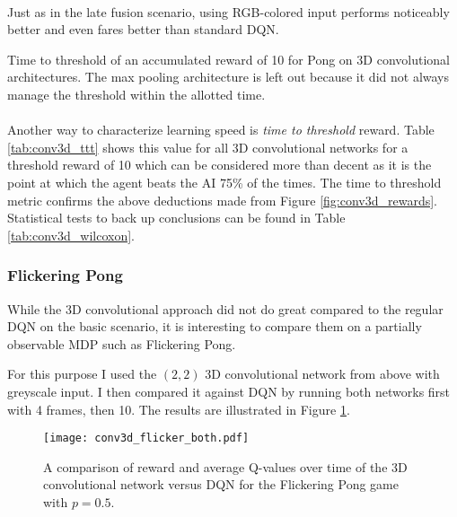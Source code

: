 \paragraph{}
Just as in the late fusion scenario,
using RGB-colored input performs noticeably better
and even fares better than standard DQN.

\begin{table}
  \center
  \renewcommand{\arraystretch}{1.3}
  
  \caption[3D Conv time to threshold]{
    Time to threshold
    of an accumulated reward of 10
    for Pong
    on 3D convolutional architectures.
    The max pooling architecture is left out
    because it did not always manage the threshold
    within the allotted time.
  }
  \label{tab:conv3d_ttt}
\end{table}

\paragraph{}
Another way to characterize learning speed is
\textit{time to threshold} reward.
Table \ref{tab:conv3d_ttt}
shows this value for all 3D convolutional networks
for a threshold reward of 10
which can be considered more than decent
as it is the point at which
the agent beats the AI
75\% of the times.
The time to threshold metric
confirms the above deductions made
from Figure \ref{fig:conv3d_rewards}.
Statistical tests to back up conclusions
can be found in Table \ref{tab:conv3d_wilcoxon}.

\subsubsection{Flickering Pong}
While the 3D convolutional approach
did not do great compared to the regular DQN
on the basic scenario,
it is interesting to compare them
on a partially observable MDP
such as Flickering Pong.

For this purpose I used the $(2,2)$ 3D convolutional network from above
with greyscale input.
I then compared it against DQN by running both
networks first with 4 frames, then 10.
The results are illustrated in Figure \ref{fig:conv3d_flicker_both}.

\begin{figure}[htpb]
  \centering
  \texttt{[image: conv3d\_flicker\_both.pdf]}
  \caption[3D Conv Flickering Pong performance]{
    A comparison
    of reward and average Q-values over time
    of the 3D convolutional network versus DQN
    for the Flickering Pong game with $p=0.5$.
  }
  \label{fig:conv3d_flicker_both}
\end{figure}

